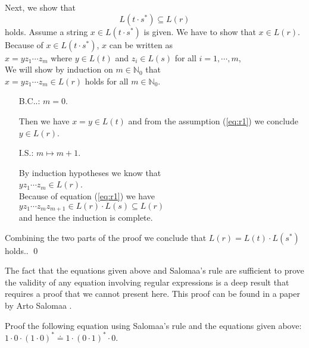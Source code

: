 Next, we show that
\begin{equation}
  \label{eq:r4}
  L(t \cdot s^*) \subseteq L(r)
\end{equation}
holds.  Assume  a string  $x \in L(t \cdot s^*)$ is given.  We have to show that 
$x \in L(r)$.  Because of  $x \in L(t \cdot s^*)$,  $x$ can be written as
\\[0.2cm]
\hspace*{1.3cm}
$x = y z_1 \cdots z_m$ \quad where $y \in L(t)$ and $z_i \in L(s)$ for all $i=1,\cdots,m$,
\\[0.2cm]
We will show by induction on  $m \in \mathbb{N}_0$ that
\\[0.2cm]
\hspace*{1.3cm}
$x = y z_1 \cdots z_m \in L(r)$ \quad holds for all $m \in \mathbb{N}_0$.
\begin{enumerate}
\item[B.C..:] $m= 0$.

             Then we have $x = y \in L(t)$ and from the assumption (\ref{eq:r1}) we conclude
             $y \in L(r)$.
\item[I.S.:] $m \mapsto m + 1$.

             By induction hypotheses we know that
             \\[0.2cm]
             \hspace*{1.3cm}
             $y z_1 \cdots z_m \in L(r)$.
             \\[0.2cm]
             Because of equation (\ref{eq:r1}) we have
             \\[0.2cm]
             \hspace*{1.3cm}
             $y z_1 \cdots z_m z_{m+1} \in L(r) \cdot L(s) \subseteq L(r)$
             \\[0.2cm]
             and hence the induction is complete.
\end{enumerate}
Combining the two parts of the proof we conclude that  $L(r) = L(t) \cdot L(s^*)$ holds..
\qed



\remarkEng
The fact that the equations given above and Salomaa's rule are sufficient to prove the validity of
any equation involving regular expressions is a deep result that requires a proof that we cannot
present here.  This proof can be found in a paper by Arto Salomaa \cite{salomaa:66}.

\exerciseEng
Proof the following equation using Salomaa's rule and the equations given above:
\\[0.2cm]
\hspace*{1.3cm}
$1 \cdot 0 \cdot (1 \cdot 0)^* \doteq  1 \cdot (0 \cdot 1)^* \cdot 0$.
\vspace*{0.1cm}


